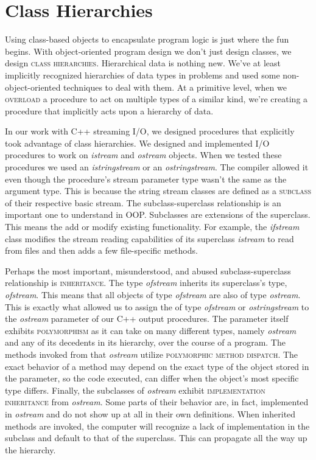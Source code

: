 \documentclass[]{tufte-handout}
\begin{document}
\section{Class Hierarchies}

Using class-based objects to encapsulate program logic is just where the fun begins. With object-oriented program design we don't just design classes, we design \textsc{class hierarchies}. Hierarchical data is nothing new. We've at least implicitly recognized hierarchies of data types in problems and used some non-object-oriented techniques to deal with them. At a primitive level, when we \textsc{overload} a procedure to act on multiple types of a similar kind, we're creating a procedure that implicitly acts upon a hierarchy of data. 

In our work with C++ streaming I/O, we designed procedures that explicitly took advantage of class hierarchies.  We designed and implemented I/O procedures to work on \textit{istream} and \textit{ostream} objects. When we tested these procedures we used an \textit{istringstream} or an \textit{ostringstream}. The compiler allowed it even though the procedure's stream parameter type wasn't the same as the argument type. This is because the string stream classes are defined as a \textsc{subclass} of their respective basic stream. The subclass-superclass relationship is an important one to understand in OOP. Subclasses are extensions of the superclass. This means the add or modify existing functionality. For example, the \textit{ifstream} class modifies the stream reading capabilities of its superclass \textit{istream} to read from files and then adds a few file-specific methods. 

Perhaps the most important, misunderstood, and abused subclass-superclass relationship is \textsc{inheritance}. The type \textit{ofstream} inherits its superclass's type, \textit{ofstream}. This means that all objects of type \textit{ofstream} are also of type \textit{ostream}. This is exactly what allowed us to assign the of type \textit{ofstream} or \textit{ostringstream} to the \textit{ostream} parameter of our C++ output procedures.  The parameter itself exhibits \textsc{polymorphism} as it can take on many different types, namely \textit{ostream} and any of its decedents in its hierarchy, over the course of a program. The methods invoked from that \textit{ostream} utilize \textsc{polymorphic method dispatch}.  The exact behavior of a method may depend on the exact type of the object stored in the parameter, so the code executed, can differ when the object's most specific type differs. Finally, the subclasses of \textit{ostream} exhibit \textsc{implementation inheritance} from \textit{ostream}.  Some parts of their behavior are, in fact, implemented in \textit{ostream} and do not show up at all in their own definitions. When inherited methods are invoked, the computer will recognize a lack of implementation in the subclass and default to that of the superclass. This can propagate all the way up the hierarchy. 
\end{document}
